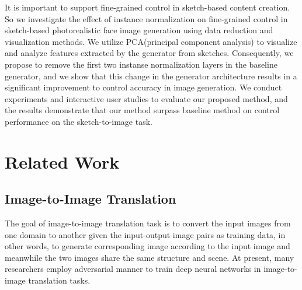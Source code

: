 \documentclass[10pt,twocolumn,letterpaper]{article}
\begin{document}
It is important to support fine-grained control in sketch-based content creation. 
So we investigate the effect of instance normalization on fine-grained control in sketch-based photorealistic face image generation using data reduction and visualization methods. 
We utilize PCA(principal component analysis)\cite{pca} to visualize and analyze features extracted by the generator from sketches. Consequently, we propose to remove the first two instanse normalization layers in the baseline generator, and we show that this change in the generator architecture results in a significant improvement to control accuracy in image generation. 
We conduct experiments and interactive user studies to evaluate our proposed method, and the results demonstrate that our method surpass baseline method on control performance on the sketch-to-image task.

\section{Related Work}
\subsection{Image-to-Image Translation}
The goal of image-to-image translation task is to convert the input images from one domain to another given the input-output image pairs as training data, in other words, to generate corresponding image according to the input image and meanwhile the two images share the same structure and scene. At present, many researchers employ adversarial manner to train deep neural networks in image-to-image translation tasks\cite{cyclegan,bicyclegan,spagan,munit,crn,cfgan,sis,cfgan,maskgan}.
\end{document}
